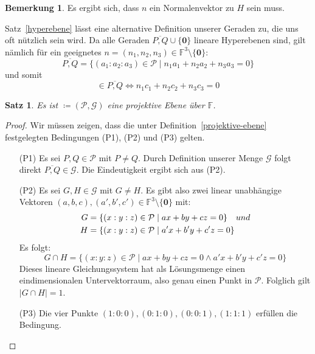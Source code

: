 \documentclass[hidelinks]{article}
\theoremstyle{plain}
\newtheorem{thm}{Satz}[section]
\theoremstyle{definition}
\theoremstyle{rem}
\newtheorem*{remark}{Bemerkung}
\newcommand{\pgtwo}{PG(2, $\mathbb{F}$)\ }
\newcommand{\ftnz}{\mathbb{F}^{3}\setminus\{\boldsymbol 0\}}
\begin{document}
\begin{sloppypar}
\begin{remark}
Es ergibt sich, dass $n$ ein Normalenvektor zu $H$ sein muss.
\end{remark}
Satz~\ref{hyperebene} lässt eine alternative Definition unserer Geraden zu, die uns oft nützlich sein wird. Da alle Geraden $\overline{P,Q}\cup\{\boldsymbol 0\}$ lineare Hyperebenen sind, gilt nämlich für ein geeignetes \mbox{$n=(n_1,n_2,n_3)\in\ftnz$}:
\begin{equation*}
	\overline{P,Q}=\{(a_1:a_2:a_3)\in\mathcal{P}\mid n_1a_1+n_2a_2+n_3a_3=0\}
\end{equation*}
und somit
\begin{equation*}
	[c]\in\overline{P,Q}\Leftrightarrow n_1c_1+n_2c_2+n_3c_3=0
\end{equation*}

\begin{thm}
	Es ist \normalfont{\pgtwo}$\coloneqq(\mathcal{P},\mathcal{G})$ eine projektive Ebene über $\mathbb{F}$.
\end{thm}
\begin{proof}
	Wir müssen zeigen, dass die unter Definition~\ref{projektive-ebene} festgelegten Bedingungen (P1), (P2) und (P3) gelten.
\begin{enumerate}
	\item[(P1)] Es sei $P,Q\in\mathcal{P}$ mit $P\ne Q$. Durch Definition unserer Menge $\mathcal{G}$ folgt direkt $\overline{P,Q}\in\mathcal{G}$.
	Die Eindeutigkeit ergibt sich aus (P2).
	\item[(P2)] Es sei $G,H\in\mathcal{G}$ mit $G\ne H$. Es gibt also zwei linear unabhängige Vektoren $(a,b,c),(a',b',c')\in\ftnz$ mit:
	\begin{align*}
	G & = \{(x:y:z)\in\mathcal{P}\mid ax+by+cz=0\}\quad\normalfont{und}\\
	H & =\{(x:y:z)\in\mathcal{P}\mid a'x+b'y+c'z=0\}
	\end{align*}
	Es folgt:
	\begin{equation*}
		G\cap H=\{(x:y:z)\in\mathcal{P}\mid ax+by+cz=0\land a'x+b'y+c'z=0\}
	\end{equation*}
	Dieses lineare Gleichungssystem hat als Lösungsmenge einen eindimensionalen Untervektorraum, also genau einen Punkt in $\mathcal{P}$. Folglich gilt $|G\cap H|=1$.
	\item[(P3)] Die vier Punkte $(1:0:0),(0:1:0),(0:0:1),(1:1:1)$ erfüllen die Bedingung.
	\vspace{-1em}
\end{enumerate}
\end{proof}

\end{sloppypar}
\end{document}
